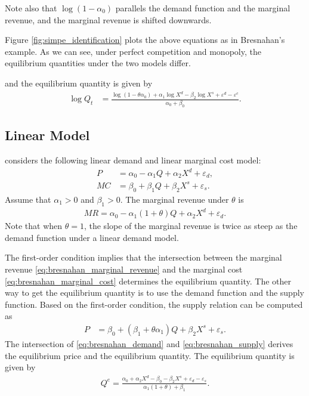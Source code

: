 \documentclass[11pt, a4paper]{article}
\theoremstyle{remark}
\begin{document}
Note also that $\log (1 - \alpha_0)$ parallels the demand function and the marginal revenue, and the marginal revenue is shifted downwards.

Figure \ref{fig:simpe_identification} plots the above equations as in Bresnahan's example.
As we can see, under perfect competition and monopoly, the equilibrium quantities under the two models differ.

and the equilibrium quantity is given by
\begin{align}
    \log Q_t &= \frac{ \log (1 - \theta \alpha_0 ) + \alpha_1 \log X^{d}- \beta_2 \log X^{s} + \varepsilon^{d} - \varepsilon^{c}}{\alpha_0 + \beta_0 }.\label{eq:quantity_loglinear}
\end{align}



\subsection{Linear Model}

\citet{bresnahan1982oligopoly} considers the following linear demand and linear marginal cost model:
\begin{align}
    P & = \alpha_0 - \alpha_1 Q + \alpha_2 X^d + \varepsilon_d,\label{eq:bresnahan_demand} \\
    MC & = \beta_0 + \beta_1 Q + \beta_2 X^s + \varepsilon_s. \label{eq:bresnahan_marginal_cost}
\end{align}
Assume that $\alpha_1>0$ and $\beta_1 >0$.
The marginal revenue under $\theta$ is
\begin{align}
    MR = \alpha_0 - \alpha_1(1 + \theta) Q + \alpha_2 X^d + \varepsilon_d. \label{eq:bresnahan_marginal_revenue}
\end{align}
Note that when $\theta = 1$, the slope of the marginal revenue is twice as steep as the demand function under a linear demand model.

The first-order condition implies that the intersection between the marginal revenue \eqref{eq:bresnahan_marginal_revenue} and the marginal cost \eqref{eq:bresnahan_marginal_cost} determines the equilibrium quantity.
The other way to get the equilibrium quantity is to use the demand function and the supply function.
Based on the first-order condition, the supply relation can be computed as
\begin{align}
    P & = \beta_0 + (\beta_1 + \theta\alpha_1) Q  + \beta_2 X^s + \varepsilon_s.\label{eq:bresnahan_supply}
\end{align}
The intersection of \eqref{eq:bresnahan_demand} and \eqref{eq:bresnahan_supply} derives the equilibrium price and the equilibrium quantity.
The equilibrium quantity is given by
\begin{align}
    Q^e = \frac{\alpha_0 + \alpha_2 X^d - \beta_0 - \beta_2 X^s + \varepsilon_d - \varepsilon_s}{\alpha_1(1 + \theta) +  \beta_1}.
\end{align}
\end{document}
